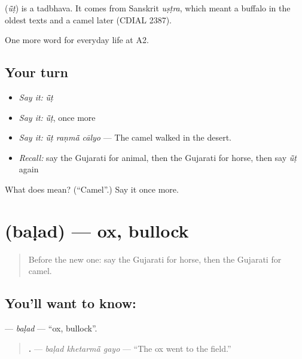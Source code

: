 \begin{cousinweb}
\textbf{} (\emph{ū̃ṭ}) is a tadbhava. It comes from Sanskrit \emph{uṣṭra}, which meant a buffalo in the oldest texts and a camel later (CDIAL 2387).
\end{cousinweb}

\begin{grammarlens}[title={What you've built}]
One more word for everyday life at A2.
\end{grammarlens}

\subsection*{Your turn}
\begin{itemize}
\raggedright
  \item \emph{Say it:} \emph{ū̃ṭ}
  \item \emph{Say it:} \emph{ū̃ṭ}, once more
  \item \emph{Say it:} \emph{ū̃ṭ raṇmā̃ cālyo} — The camel walked in the desert.
  \item \emph{Recall:} say the Gujarati for animal, then the Gujarati for horse, then say \emph{ū̃ṭ} again
\end{itemize}

\begin{tcolorbox}[breakable,colback=teal!4,colframe=teal!35!black,title={Before you move on}]
What does  mean? (\textquotedblleft{}Camel\textquotedblright{}.) Say it once more.
\end{tcolorbox}
\section[\texorpdfstring{\gu{બળદ} (baḷad)}{બળદ (baḷad)}]{ (baḷad) — ox, bullock}

\label{lesson:GU-C233-balad}



\begin{quote}
Before the new one: say the Gujarati for horse, then the Gujarati for camel.
\end{quote}

\subsection*{You'll want to know: }
\textbf{} — \emph{baḷad} — \textquotedblleft{}ox, bullock\textquotedblright{}.

\begin{quote}
\textbf{  .} — \emph{baḷad khetarmā̃ gayo} — \textquotedblleft{}The ox went to the field.\textquotedblright{}
\end{quote}

